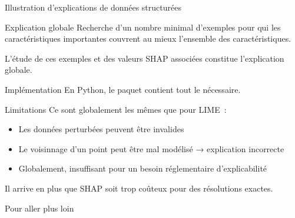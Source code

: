 \begin{frame}{Illustration d'explications de données structurées}
\end{frame}

\begin{frame}{Explication globale}
  Recherche d'un nombre minimal d'exemples pour qui les caractéristiques importantes couvrent au mieux l'ensemble des caractéristiques.

  L'étude de ces exemples et des valeurs SHAP associées constitue l'explication globale.
\end{frame}

\begin{frame}{Implémentation}
  En Python, le paquet  contient tout le nécessaire.
\end{frame}

\begin{frame}{Limitations}
  Ce sont globalement les mêmes que pour LIME~:
  \begin{itemize}
    \item Les données perturbées peuvent être invalides
    \item Le voisinnage d'un point peut être mal modélisé → explication incorrecte
    \item Globalement, insuffisant pour un besoin réglementaire d'explicabilité
  \end{itemize}

  Il arrive en plus que SHAP soit trop coûteux pour des résolutions exactes.
\end{frame}

\begin{frame}{Pour aller plus loin}
\end{frame}
